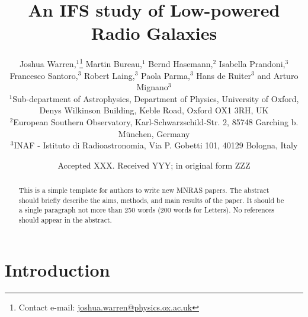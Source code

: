 \documentclass[a4paper,fleqn,usenatbib]{mnras}
\title[An IFS study of Low-powered Radio Galaxies]{An IFS study of Low-powered Radio Galaxies}
\author[J. Warren et al.]{
Joshua Warren,$^{1}$\thanks{Contact e-mail: \href{mailto:joshua.warren@physics.ox.ac.uk}{joshua.warren@physics.ox.ac.uk}}
Martin Bureau,$^{1}$
Bernd Hasemann,$^{2}$
Isabella Prandoni,$^{3}$ \newauthor
Francesco Santoro,$^{3}$
Robert Laing,$^{3}$
Paola Parma,$^{3}$
Hans de Ruiter$^{3}$
and \newauthor
Arturo Mignano$^{3}$
\\
$^{1}$Sub-department of Astrophysics, Department of Physics, University of Oxford, Denys Wilkinson Building, Keble Road, Oxford OX1 3RH, UK\\
$^{2}$European Southern Observatory, Karl-Schwarzschild-Str. 2, 85748 Garching b. München, Germany\\
$^{3}$INAF - Istituto di Radioastronomia, Via P. Gobetti 101, 40129 Bologna, Italy}
\date{Accepted XXX. Received YYY; in original form ZZZ}
\begin{document}
\label{firstpage}
\pagerange{\pageref{firstpage}--\pageref{lastpage}}
\maketitle

\begin{abstract}
This is a simple template for authors to write new MNRAS papers.
The abstract should briefly describe the aims, methods, and main results of the paper.
It should be a single paragraph not more than 250 words (200 words for Letters).
No references should appear in the abstract.
\end{abstract}

\begin{keywords}
\end{keywords}




\section{Introduction}
	\label{sec:intro}

\end{document}
